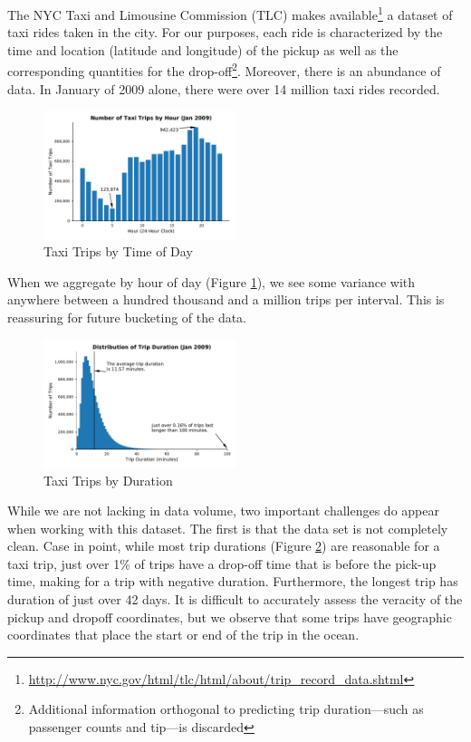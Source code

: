 \documentclass{article}
\begin{document}
The NYC Taxi and Limousine Commission (TLC) makes
available\footnote{\url{http://www.nyc.gov/html/tlc/html/about/trip_record_data.shtml}}
a dataset of taxi rides taken in the city. For our purposes, each ride is
characterized by the time and location (latitude and longitude) of the pickup as
well as the corresponding quantities for the drop-off\footnote{Additional
information orthogonal to predicting trip duration---such as passenger
counts and tip---is discarded}. Moreover, there is an abundance of data. In
January of 2009 alone, there were over 14 million taxi rides recorded.

\begin{figure}[h]
\centering
\includegraphics[width=0.5\textwidth]{figs/ridesbyhour.pdf}
\caption{Taxi Trips by Time of Day}
\label{fig:ridesbyhour}
\end{figure}

When we aggregate by hour of day (Figure \ref{fig:ridesbyhour}), we see some variance with anywhere between
a hundred thousand and a million trips per interval. This is reassuring for
future bucketing of the data. 


\begin{figure}[h]
\centering
\includegraphics[width=0.5\textwidth]{figs/tripdurations.pdf}
\caption{Taxi Trips by Duration}
\label{fig:tripdurations}
\end{figure}

While we are not lacking in data volume, two important challenges do appear when
working with this dataset. The first is that the data set is not completely clean.
Case in point, while most trip durations (Figure \ref{fig:tripdurations}) are
reasonable for a taxi trip, just over 1\% of trips have a drop-off time that is
before the pick-up time, making for a trip with negative duration. Furthermore,
the longest trip has duration of just over 42 days. It is difficult to
accurately assess
the veracity of the pickup and dropoff coordinates, but we observe
that some trips
have geographic coordinates that place the start or end of the trip in the
ocean.
\end{document}
